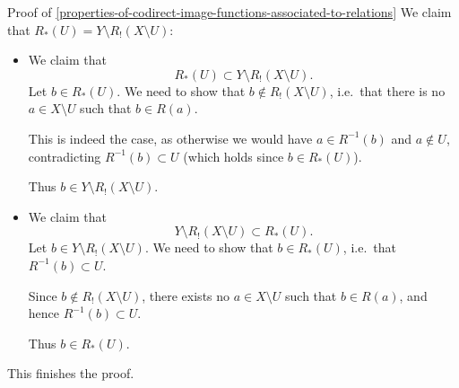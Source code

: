 \begin{Proof}{Proof of \cref{properties-of-codirect-image-functions-associated-to-relations}}
    We claim that $R_{*}(U)=Y\setminus R_{!}(X\setminus U)$:
    \begin{itemize}
        \item{}We claim that
            \[
                R_{*}(U)%
                \subset%
                Y\setminus R_{!}(X\setminus U).%
            \]%
            Let $b\in R_{*}(U)$. We need to show that $b\nin R_{!}(X\setminus U)$, i.e.\ that there is no $a\in X\setminus U$ such that $b\in R(a)$.

            This is indeed the case, as otherwise we would have $a\in R^{-1}(b)$ and $a\nin U$, contradicting $R^{-1}(b)\subset U$ (which holds since $b\in R_{*}(U)$).

            Thus $b\in Y\setminus R_{!}(X\setminus U)$.
        \item{}We claim that
            \[
                Y\setminus R_{!}(X\setminus U)%
                \subset%
                R_{*}(U).%
            \]%
            Let $b\in Y\setminus R_{!}(X\setminus U)$. We need to show that $b\in R_{*}(U)$, i.e.\ that $R^{-1}(b)\subset U$.

            Since $b\nin R_{!}(X\setminus U)$, there exists no $a\in X\setminus U$ such that $b\in R(a)$, and hence $R^{-1}(b)\subset U$.

            Thus $b\in R_{*}(U)$.
    \end{itemize}
    This finishes the proof.
\end{Proof}
